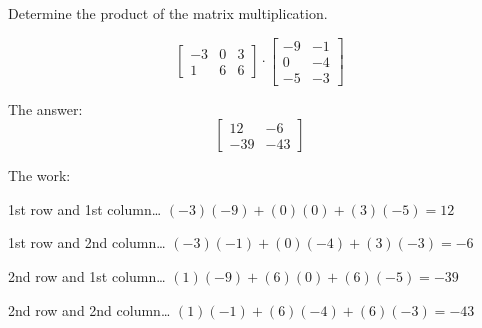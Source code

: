 
\begin{question}
Determine the product of the matrix multiplication.

\[\left[\begin{matrix}-3 & 0 & 3\\1 & 6 & 6\end{matrix}\right] \cdot \left[\begin{matrix}-9 & -1\\0 & -4\\-5 & -3\end{matrix}\right]\]
\end{question}

\begin{solution}
The answer:
\[\left[\begin{matrix}12 & -6\\-39 & -43\end{matrix}\right]\]

The work:

1st row and 1st column\ldots{} \((-3)(-9)+(0)(0)+(3)(-5) = 12\)

1st row and 2nd column\ldots{} \((-3)(-1)+(0)(-4)+(3)(-3) = -6\)

2nd row and 1st column\ldots{} \((1)(-9)+(6)(0)+(6)(-5) = -39\)

2nd row and 2nd column\ldots{} \((1)(-1)+(6)(-4)+(6)(-3) = -43\)
\end{solution}

